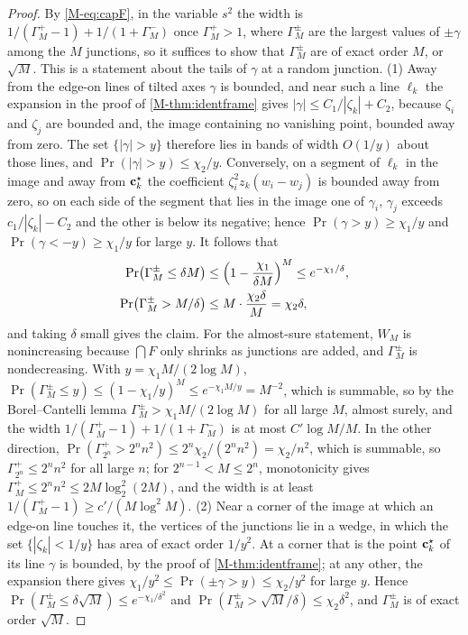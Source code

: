 \begin{proof}
By \eqref{M-eq:capF}, in the variable $s^2$ the width is $1/(\Gamma^{+}_M-1)+1/(1+\Gamma^{-}_M)$ once $\Gamma^{+}_M>1$, where $\Gamma^{\pm}_M$ are the largest values of $\pm \gamma$ among the $M$ junctions, so it suffices to show that $\Gamma^{\pm}_M$ are of exact order $M$, or $\sqrt M$. This is a statement about the tails of $\gamma$ at a random junction. (1) Away from the edge-on lines of tilted axes $\gamma$ is bounded, and near such a line $\ell_k$ the expansion in the proof of \cref{M-thm:identframe} gives $|\gamma|\le C_1/|\zeta_k|+C_2$, because $\zeta_i$ and $\zeta_j$ are bounded and, the image containing no vanishing point, bounded away from zero. The set $\{|\gamma|>y\}$ therefore lies in bands of width $O(1/y)$ about those lines, and $\Pr(|\gamma|>y)\le\chi_2/y$. Conversely, on a segment of $\ell_k$ in the image and away from $\mathbf{c}^{\star}_k$ the coefficient $\zeta_i^2z_k(w_i-w_j)$ is bounded away from zero, so on each side of the segment that lies in the image one of $\gamma_i$, $\gamma_j$ exceeds $c_1/|\zeta_k|-C_2$ and the other is below its negative; hence $\Pr(\gamma>y)\ge\chi_1/y$ and $\Pr(\gamma<-y)\ge\chi_1/y$ for large $y$. It follows that
\[
\begin{aligned}
\Pr\bigl(\Gamma^{\pm}_M\le\delta M\bigr)&\le\Bigl(1-\frac{\chi_1}{\delta M}\Bigr)^{M}\le e^{-\chi_1/\delta},\\
\Pr\bigl(\Gamma^{\pm}_M>M/\delta\bigr)&\le M\cdot\frac{\chi_2\delta}{M}=\chi_2\delta ,
\end{aligned}
\]
and taking $\delta$ small gives the claim. For the almost-sure statement, $W_M$ is nonincreasing because $\bigcap F$ only shrinks as junctions are added, and $\Gamma^{\pm}_M$ is nondecreasing. With $y=\chi_1M/(2\log M)$, $\Pr(\Gamma^{\pm}_M\le y)\le(1-\chi_1/y)^M\le e^{-\chi_1M/y}=M^{-2}$, which is summable, so by the Borel--Cantelli lemma $\Gamma^{\pm}_M>\chi_1M/(2\log M)$ for all large $M$, almost surely, and the width $1/(\Gamma^+_M-1)+1/(1+\Gamma^-_M)$ is at most $C'\log M/M$. In the other direction, $\Pr(\Gamma^+_{2^n}>2^nn^2)\le2^n\chi_2/(2^nn^2)=\chi_2/n^2$, which is summable, so $\Gamma^+_{2^n}\le2^nn^2$ for all large $n$; for $2^{n-1}<M\le2^n$, monotonicity gives $\Gamma^+_M\le2^nn^2\le2M\log_2^2(2M)$, and the width is at least $1/(\Gamma^+_M-1)\ge c'/(M\log^2M)$. (2) Near a corner of the image at which an edge-on line touches it, the vertices of the junctions lie in a wedge, in which the set $\{|\zeta_k|<1/y\}$ has area of exact order $1/y^2$. At a corner that is the point $\mathbf{c}^{\star}_k$ of its line $\gamma$ is bounded, by the proof of \cref{M-thm:identframe}; at any other, the expansion there gives $\chi_1/y^2\le\Pr(\pm \gamma>y)\le\chi_2/y^2$ for large $y$. Hence $\Pr(\Gamma^{\pm}_M\le\delta\sqrt M)\le e^{-\chi_1/\delta^2}$ and $\Pr(\Gamma^{\pm}_M>\sqrt M/\delta)\le\chi_2\delta^2$, and $\Gamma^{\pm}_M$ is of exact order $\sqrt M$.

\end{proof}
